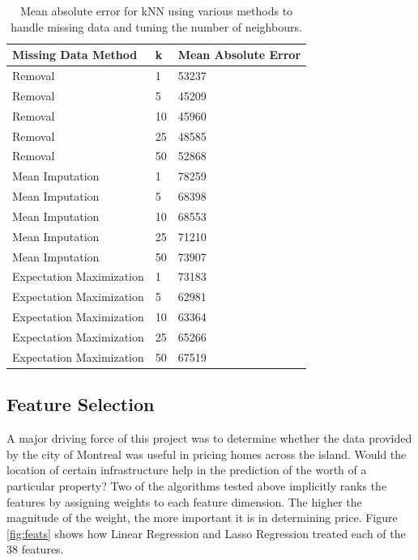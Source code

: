 \documentclass{acm_proc_article-sp}
\begin{document}
	\begin{center}
	\begin{table}	
    \begin{tabular}{| l | l | l |}
    \hline
    Missing Data Method & k & Mean Absolute Error \\ \hline
    \hline
	Removal & 1 & 53237 \\
	\hline
Removal & 5 & 45209\\
\hline
Removal & 10 & 45960\\
\hline
Removal & 25 & 48585\\
\hline
Removal & 50 & 52868\\
	\hline
    Mean Imputation & 1 & 78259\\
    \hline
Mean Imputation & 5& 68398\\
\hline
Mean Imputation & 10 &68553\\
\hline
Mean Imputation & 25 &71210\\
\hline
Mean Imputation & 50& 73907\\
    \hline
    Expectation Maximization & 1 & 73183\\
    \hline
Expectation Maximization & 5 &62981\\
\hline
Expectation Maximization & 10 &63364\\
\hline
Expectation Maximization & 25 &65266\\
\hline
Expectation Maximization & 50 &67519\\
    \hline
    \end{tabular}
    \caption{Mean absolute error for kNN using various methods to handle missing data and tuning the number of neighbours.}
    \label{fig:knnres}
    \end{table}
\end{center}
\subsection{Feature Selection}
	A major driving force of this project was to determine whether the data provided by the city of Montreal was useful in pricing homes across the island. Would the location of certain infrastructure help in the prediction of the worth of a particular property? Two of the algorithms tested above implicitly ranks the features by assigning weights to each feature dimension. The higher the magnitude of the weight, the more important it is in determining price. Figure \ref{fig:feats} shows how Linear Regression and Lasso Regression treated each of the 38 features. 
	
\end{document}
